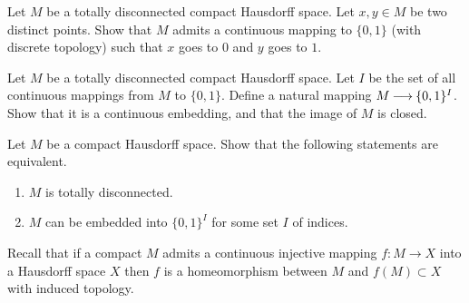 \documentclass[12pt]{article}
\begin{document}
\begin{zadacha}[*]
Let $M$ be a totally disconnected compact Hausdorff space.
Let $x, y \in M$ be two distinct points.
Show that $M$ admits a continuous mapping to 
$\{0, 1\}$ (with discrete topology) such that $x$ goes to $0$ and 
$y$ goes to $1$.
\end{zadacha}

\begin{zadacha}[*]
Let $M$ be a totally disconnected compact Hausdorff space.
Let $I$ be the set of all continuous mappings from 
$M$ to $\{0, 1\}$. Define a natural mapping
$M {\:\longrightarrow\:} \{0, 1\}^I$. Show that it is a continuous embedding, 
and that the image of $M$ is closed.
\end{zadacha}

\begin{zadacha}[*]
Let $M$ be a compact Hausdorff space. Show that the following
statements are equivalent.
\begin{enumerate}
\renewcommand{\labelenumi}{(\roman{enumi})}
\item $M$ is totally disconnected.
\item $M$ can be embedded into $\{0, 1\}^I$
for some set $I$ of indices.
\end{enumerate}
\end{zadacha}

\begin{zamechanie}
Recall that if a compact
$M$ admits a continuous injective mapping
$f:M \to X$ into a Hausdorff space $X$ then $f$ is a homeomorphism
between $M$ and $f(M) \subset X$ with induced topology.
\end{zamechanie}
\end{document}
